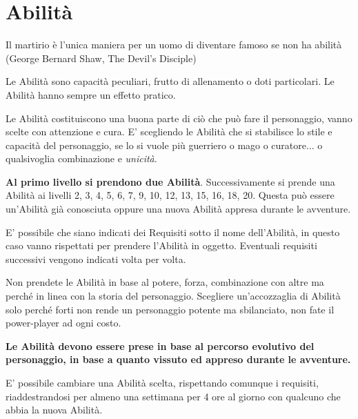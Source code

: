 \section{Abilità}\hypertarget{abilita}{}\label{abilita}

\begin{changemargin}{0.3cm}{0.3cm}\begin{enfasi}{Il martirio è l'unica maniera per un uomo di diventare famoso se non ha abilità (George Bernard Shaw, The Devil's Disciple)} \end{enfasi}\end{changemargin}\medskip

\begin{multicols}{2}

Le Abilità sono capacità peculiari, frutto di allenamento o doti particolari. Le Abilità hanno sempre un effetto pratico.

Le Abilità costituiscono una buona parte di ciò che può fare il personaggio, vanno scelte con attenzione e cura. E' scegliendo le Abilità che si stabilisce lo stile e capacità del personaggio, se lo si vuole più guerriero o mago o curatore... o qualsivoglia combinazione e \emph{unicità}.

\textbf{Al primo livello si prendono due Abilità}. Successivamente si prende una Abilità ai livelli 2, 3, 4, 5, 6, 7, 9, 10, 12, 13, 15, 16, 18, 20. Questa può essere un'Abilità già conosciuta oppure una nuova Abilità appresa durante le avventure.

E' possibile che siano indicati dei Requisiti sotto il nome dell'Abilità, in questo caso vanno rispettati per prendere l'Abilità in oggetto.
Eventuali requisiti successivi vengono indicati volta per volta.

Non prendete le Abilità in base al potere, forza, combinazione con altre ma perché in linea con la storia del personaggio.
Scegliere un'accozzaglia di Abilità solo perché forti non rende un personaggio potente ma sbilanciato, non fate il power-player ad ogni costo.

\medskip

\textbf{Le Abilità devono essere prese in base al percorso evolutivo del personaggio, in base a quanto vissuto ed appreso durante le avventure.}

\medskip

E' possibile cambiare una Abilità scelta, rispettando comunque i requisiti, riaddestrandosi per almeno una settimana per 4 ore al giorno con qualcuno che abbia la nuova Abilità.


\end{multicols}
